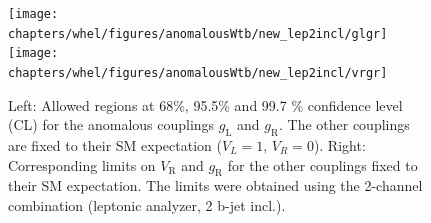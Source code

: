 \begin{figure}[!h]
\begin{center}

		\texttt{[image: chapters/whel/figures/anomalousWtb/new\_lep2incl/glgr]}
				\texttt{[image: chapters/whel/figures/anomalousWtb/new\_lep2incl/vrgr]}
	\caption{Left: Allowed regions at 68\%, 95.5\% and 99.7 \% confidence level (CL) for the \Wtb anomalous couplings $g_{\text{L}}$ and $g_{\text{R}}$. The other couplings are fixed to their SM expectation ($V_L = 1$, $V_R = 0$). Right: Corresponding limits on $V_{\text{R}}$ and $g_{\text{R}}$ for the other couplings fixed to their SM expectation. The limits were obtained using the 2-channel combination (leptonic analyzer, 2 b-jet incl.).}
	\label{fig:anomalousLimits_2d_2ch}
\end{center}
\end{figure}

